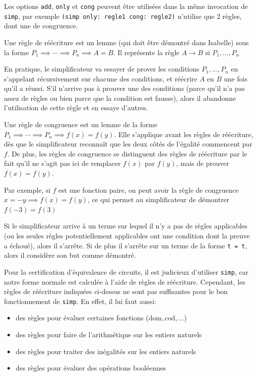 \documentclass[12pt, a4paper]{article}
\def\dom{ \mathrm{dom} }
\def\cod{ \mathrm{cod} }
\begin{document}
Les options \lstinline[language=Isar]|add|, \lstinline[language=Isar]|only| et \lstinline[language=Isar]|cong| peuvent être utilisées dans la même invocation de \lstinline[language=Isar]|simp|, par exemple \lstinline[language=Isar]|(simp only: regle1 cong: regle2)| n'utilise que 2 règles, dont une de congruence.

Une règle de réécriture est un lemme (qui doit être démontré dans Isabelle) sous la forme $P_1 \implies \cdots \implies P_n \implies A = B$. Il représente la règle $A \to B \text{ si } P_1, \ldots, P_n$

En pratique, le simplificateur va essayer de prover les conditions $P_1, \ldots, P_n$ en s'appelant récursivement sur chacune des conditions, et réécrire $A$ en $B$ une fois qu'il a réussi. S'il n'arrive pas à prouver une des conditions (parce qu'il n'a pas assez de règles ou bien parce que la condition est fausse), alors il abandonne l'utilisation de cette règle et en essaye d'autres.

Une règle de congruence est un lemme de la forme $P_1 \implies \cdots \implies P_n \implies f(x) = f(y)$. Elle s'applique avant les règles de réécriture, dès que le simplificateur reconnaît que les deux côtés de l'égalité commencent par $f$. De plus, les règles de congruence se distinguent des règles de réécriture par le fait qu'il ne s'agit pas ici de remplacer $f(x)$ par $f(y)$, mais de prouver $f(x) = f(y)$.

Par exemple, si $f$ est une fonction paire, on peut avoir la règle de congruence $x = -y \implies f(x) = f(y)$, ce qui permet au simplificateur de démontrer $f(-3) = f(3)$

Si le simplificateur arrive à un terme sur lequel il n'y a pas de règles applicables (ou les seules règles potentiellement applicables ont une condition dont la preuve a échoué), alors il s'arrête. Si de plus il s'arrête sur un terme de la forme \verb|t = t|, alors il considère son but comme démontré.


Pour la certification d'équivalence de circuits, il est judicieux d'utiliser \verb|simp|, car notre forme normale est calculée à l'aide de règles de réécriture. Cependant, les règles de réécriture indiquées ci-dessus ne sont pas suffisantes pour le bon fonctionnement de \verb|simp|. En effet, il lui faut aussi:

\begin{itemize}
    \item des règles pour évaluer certaines fonctions ($\dom, \cod, \ldots$)
    \item des règles pour faire de l'arithmétique sur les entiers naturels
    \item des règles pour traiter des inégalités sur les entiers naturels
    \item des règles pour évaluer des opérations booléennes
\end{itemize}
\end{document}
